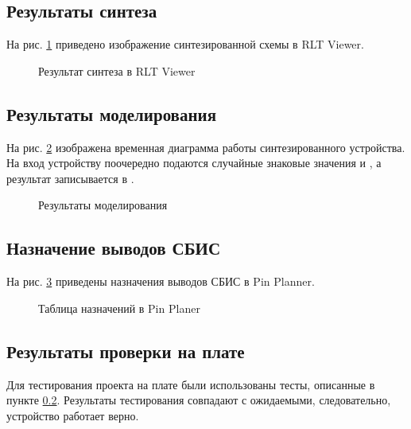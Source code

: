\subsection{Результаты синтеза}

На рис. \ref{fig:lab3_2_rtl} приведено изображение синтезированной схемы в RLT Viewer.

\begin{figure}[H]
\begin{center}
	\caption{Результат синтеза в RLT Viewer}
	\label{fig:lab3_2_rtl}
\end{center}
\end{figure}

\subsection{Результаты моделирования}
\label{sec:lab3_2_modeling}

На рис. \ref{fig:lab3_2_modeling} изображена временная диаграмма работы синтезированного устройства. На вход устройству поочередно подаются случайные знаковые значения  и , а результат записывается в .
\begin{figure}[H]
\begin{center}
	\caption{Результаты моделирования}
	\label{fig:lab3_2_modeling}
\end{center}
\end{figure}

\subsection{Назначение выводов СБИС}

На рис. \ref{fig:lab3_2_pins} приведены назначения выводов СБИС в Pin Planner.

\begin{figure}[H]
\begin{center}
	\caption{Таблица назначений в Pin Planer}
	\label{fig:lab3_2_pins}
\end{center}
\end{figure}

\subsection{Результаты проверки на плате}

Для тестирования проекта на плате были использованы тесты, описанные в пункте \ref{sec:lab3_2_modeling}. Результаты тестирования совпадают с ожидаемыми, следовательно, устройство работает верно.

